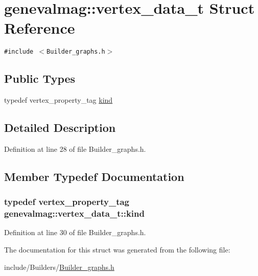 \hypertarget{structgenevalmag_1_1vertex__data__t}{
\section{genevalmag::vertex\_\-data\_\-t Struct Reference}
\label{structgenevalmag_1_1vertex__data__t}
}
{\tt \#include $<$Builder\_\-graphs.h$>$}

\subsection*{Public Types}
\begin{CompactItemize}
\item 
typedef vertex\_\-property\_\-tag \hyperlink{structgenevalmag_1_1vertex__data__t_aa8911d9d8999d67da4cbfde01a247f8}{kind}
\end{CompactItemize}


\subsection{Detailed Description}


Definition at line 28 of file Builder\_\-graphs.h.

\subsection{Member Typedef Documentation}
\hypertarget{structgenevalmag_1_1vertex__data__t_aa8911d9d8999d67da4cbfde01a247f8}{
\subsubsection[{kind}]{\setlength{\rightskip}{0pt plus 5cm}typedef vertex\_\-property\_\-tag {\bf genevalmag::vertex\_\-data\_\-t::kind}}}
\label{structgenevalmag_1_1vertex__data__t_aa8911d9d8999d67da4cbfde01a247f8}




Definition at line 30 of file Builder\_\-graphs.h.

The documentation for this struct was generated from the following file:\begin{CompactItemize}
\item 
include/Builders/\hyperlink{Builder__graphs_8h}{Builder\_\-graphs.h}\end{CompactItemize}

